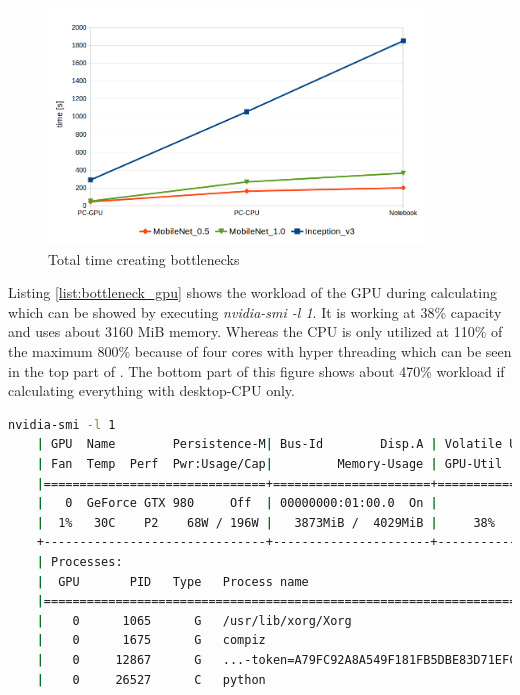 \begin{figure}[htbp]
\centering
\includegraphics[width=0.9\textwidth]{includes/bottlenecks}
\caption[Total time creating bottlenecks]{Total time creating bottlenecks}
\label{fig:bottlenecks}
\end{figure}

Listing \ref{list:bottleneck_gpu} shows the workload of the GPU during calculating which can be showed by executing \textit{nvidia-smi -l 1}. It is working at 38\% capacity and uses about 3160 MiB memory. Whereas the CPU is only utilized at 110\% of the maximum 800\% because of four cores with hyper threading which can be seen in the top part of . The bottom part of this figure shows about 470\% workload if calculating everything with desktop-CPU only.

\begin{minipage}{\linewidth}
\begin{lstlisting}[caption=Build and call of \textit{retrain}, label=list:bottleneck_gpu, language=bash]
	nvidia-smi -l 1
	| GPU  Name        Persistence-M| Bus-Id        Disp.A | Volatile Uncorr. ECC |
	| Fan  Temp  Perf  Pwr:Usage/Cap|         Memory-Usage | GPU-Util  Compute M. |
	|===============================+======================+======================|
	|   0  GeForce GTX 980     Off  | 00000000:01:00.0  On |                  N/A |
	|  1%   30C    P2    68W / 196W |   3873MiB /  4029MiB |     38%      Default |
	+-------------------------------+----------------------+----------------------+
	| Processes:                                                       GPU Memory |
	|  GPU       PID   Type   Process name                             Usage      |
	|=============================================================================|
	|    0      1065      G   /usr/lib/xorg/Xorg                           584MiB |
	|    0      1675      G   compiz                                        83MiB |
	|    0     12867      G   ...-token=A79FC92A8A549F181FB5DBE83D71EFC2    31MiB |
	|    0     26527      C   python                                      3159MiB |
\end{lstlisting}
\end{minipage}

